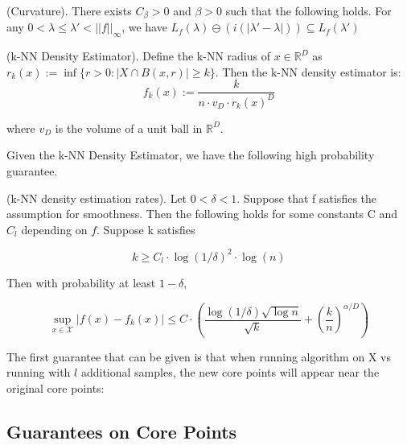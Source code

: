 \begin{remark} (Curvature).
There exists $C_\beta > 0$ and $\beta > 0$ such that the following holds. For any $0<\lambda \leq \lambda'<||f||_{\infty}$, we have $L_f(\lambda)\ominus(i(|\lambda'-\lambda|)) \subseteq L_f(\lambda')$
\end{remark}

\begin{fact}
(k-NN Density Estimator). Define the k-NN radius of $x \in \mathbb{R}^D$ as $r_k(x):=\inf\{r>0:|X\cap B(x,r)|\geq k\}$. Then the k-NN density estimator is:
\begin{equation*}
    f_k(x):=\frac{k}{n\cdot v_D \cdot r_k(x)^D}
\end{equation*}

where $v_D$ is the volume of a unit ball in $\mathbb{R}^D$.
\end{fact}

Given the k-NN Density Estimator, we have the following high probability guarantee.

\begin{lemma} (k-NN density estimation rates). Let $0<\delta<1$. Suppose that f satisfies the assumption for smoothness. Then the following holds for some constants C and $C_l$ depending on $f$. Suppose k satisfies

\begin{equation*}
    k\geq C_l\cdot\log(1/\delta)^2\cdot\log(n)
\end{equation*}

Then with probability at least $1-\delta$,

\begin{equation*}
    \sup\limits_{x\in \mathcal{X}}|f(x)-f_k(x)| \leq C \cdot \left(\frac{\log(1/\delta)\sqrt{\log n}}{\sqrt{k}} + \left(\frac{k}{n}\right)^{\alpha/D}\right)
\end{equation*}
\end{lemma}

The first guarantee that can be given is that when running algorithm on X vs running with $l$ additional samples, the new core points will appear near the original core points:

\subsection{Guarantees on Core Points}

